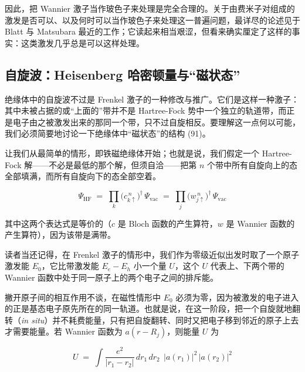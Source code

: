 

因此，把 Wannier 激子当作玻色子来处理是完全合理的。关于由费米子对组成的激发是否可以、以及何时可以当作玻色子来处理这一普遍问题，最详尽的论述见于 Blatt 与 Matsubara 最近的工作；它读起来相当艰涩，但看来确实厘定了这样的事实：这类激发几乎总是可以这样处理。

\subsection{自旋波：Heisenberg 哈密顿量与“磁状态”}

绝缘体中的自旋波不过是 Frenkel 激子的一种修改与推广。它们是这样一种激子：其中未被占据的或“上面的”带并不是 Hartree-Fock 势中一个独立的轨道带，而正是电子由之被激发出来的那同一个带，只不过自旋相反。要理解这一点何以可能，我们必须简要地讨论一下绝缘体中“磁状态”的结构 (91)。

让我们从最简单的情形，即铁磁绝缘体开始；也就是说，我们假定一个 Hartree-Fock 解——不必是最低的那个解，但须自洽——把第 $n$ 个带中所有自旋向上的态全部填满，而所有自旋向下的态全部空着。

\begin{equation*}
\Psi_{\mathrm{HF}} \;=\; \prod_k \bigl(c^{\,n}_{k\uparrow}\bigr)^{\dagger}\, \Psi_{\mathrm{vac}} \;=\; \prod_j \bigl(w^{\,n}_{j\uparrow}\bigr)^{\dagger}\, \Psi_{\mathrm{vac}}
\end{equation*}

其中这两个表达式是等价的（$c$ 是 Bloch 函数的产生算符，$w$ 是 Wannier 函数的产生算符），因为该带是满带。

读者当还记得，在 Frenkel 激子的情形中，我们作为零级近似出发时取了一个原子激发能 $E_0$，它比带激发能 $E_e - E_h$ 小一个量 $U$，这个 $U$ 代表上、下两个带的 Wannier 函数中处于同一原子上的两个电子之间的排斥能。

撇开原子间的相互作用不谈，在磁性情形中 $E_0$ 必须为零，因为被激发的电子进入的正是基态电子原先所在的同一轨道。也就是说，在这一阶段，把一个自旋就地翻转（\emph{in situ}）并不耗费能量，只有把自旋翻转、同时又把电子移到邻近的原子上去才需要能量。若 Wannier 函数为 $a(r-R_j)$，则能量 $U$ 为

\begin{equation*}
U \;=\; \int \frac{e^{2}}{|r_1 - r_2|}\, dr_1\, dr_2\;\, |a(r_1)|^{2}\, |a(r_2)|^{2}
\end{equation*}


